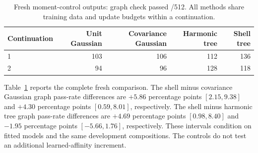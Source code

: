 \begin{table}[t]
\centering
\caption{Fresh moment-control outputs: graph check passed /512. All methods share training data and update budgets within a continuation.}
\begin{tabular}{lrrrr}
\toprule
Continuation & Unit Gaussian & Covariance Gaussian & Harmonic tree & Shell tree\\
\midrule
1 & 103 & 106 & 112 & 136\\
2 & 94 & 96 & 128 & 118\\
\bottomrule
\end{tabular}
\label{tab:moment}
\end{table}
Table~\ref{tab:moment} reports the complete fresh comparison.
The shell minus covariance Gaussian graph pass-rate differences are $+5.86$ percentage points $[2.15,9.38]$ and $+4.30$ percentage points $[0.59,8.01]$, respectively.
The shell minus harmonic tree graph pass-rate differences are $+4.69$ percentage points $[0.98,8.40]$ and $-1.95$ percentage points $[-5.66,1.76]$, respectively.
These intervals condition on fitted models and the same development compositions. The controls do not test an additional learned-affinity increment.
